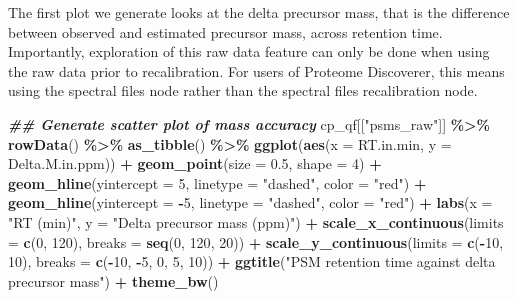 \documentclass[9pt,a4paper,]{extarticle}
\newenvironment{Shaded}{\begin{snugshade}}{\end{snugshade}}
\newcommand{\AttributeTok}[1]{\textcolor[rgb]{0.13,0.29,0.53}{#1}}
\newcommand{\DecValTok}[1]{\textcolor[rgb]{0.00,0.00,0.81}{#1}}
\newcommand{\DocumentationTok}[1]{\textcolor[rgb]{0.56,0.35,0.01}{\textbf{\textit{#1}}}}
\newcommand{\FloatTok}[1]{\textcolor[rgb]{0.00,0.00,0.81}{#1}}
\newcommand{\FunctionTok}[1]{\textcolor[rgb]{0.13,0.29,0.53}{\textbf{#1}}}
\newcommand{\NormalTok}[1]{#1}
\newcommand{\SpecialCharTok}[1]{\textcolor[rgb]{0.81,0.36,0.00}{\textbf{#1}}}
\newcommand{\StringTok}[1]{\textcolor[rgb]{0.31,0.60,0.02}{#1}}
\begin{document}
The first plot we generate looks at the delta precursor mass, that is the
difference between observed and estimated precursor mass, across retention time.
Importantly, exploration of this raw data feature can only be done when using
the raw data prior to recalibration. For users of Proteome Discoverer, this
means using the spectral files node rather than the spectral files recalibration
node.

\begin{Shaded}
\begin{Highlighting}[]
\DocumentationTok{\#\# Generate scatter plot of mass accuracy}
\NormalTok{cp\_qf[[}\StringTok{"psms\_raw"}\NormalTok{]] }\SpecialCharTok{\%\textgreater{}\%}
  \FunctionTok{rowData}\NormalTok{() }\SpecialCharTok{\%\textgreater{}\%} 
  \FunctionTok{as\_tibble}\NormalTok{() }\SpecialCharTok{\%\textgreater{}\%}
  \FunctionTok{ggplot}\NormalTok{(}\FunctionTok{aes}\NormalTok{(}\AttributeTok{x =}\NormalTok{ RT.in.min, }\AttributeTok{y =}\NormalTok{ Delta.M.in.ppm)) }\SpecialCharTok{+}
  \FunctionTok{geom\_point}\NormalTok{(}\AttributeTok{size =} \FloatTok{0.5}\NormalTok{, }\AttributeTok{shape =} \DecValTok{4}\NormalTok{) }\SpecialCharTok{+}
  \FunctionTok{geom\_hline}\NormalTok{(}\AttributeTok{yintercept =} \DecValTok{5}\NormalTok{, }\AttributeTok{linetype =} \StringTok{"dashed"}\NormalTok{, }\AttributeTok{color =} \StringTok{"red"}\NormalTok{) }\SpecialCharTok{+}
  \FunctionTok{geom\_hline}\NormalTok{(}\AttributeTok{yintercept =} \SpecialCharTok{{-}}\DecValTok{5}\NormalTok{, }\AttributeTok{linetype =} \StringTok{"dashed"}\NormalTok{, }\AttributeTok{color =} \StringTok{"red"}\NormalTok{) }\SpecialCharTok{+}
  \FunctionTok{labs}\NormalTok{(}\AttributeTok{x =} \StringTok{"RT (min)"}\NormalTok{, }\AttributeTok{y =} \StringTok{"Delta precursor mass (ppm)"}\NormalTok{) }\SpecialCharTok{+}
  \FunctionTok{scale\_x\_continuous}\NormalTok{(}\AttributeTok{limits =} \FunctionTok{c}\NormalTok{(}\DecValTok{0}\NormalTok{, }\DecValTok{120}\NormalTok{), }\AttributeTok{breaks =} \FunctionTok{seq}\NormalTok{(}\DecValTok{0}\NormalTok{, }\DecValTok{120}\NormalTok{, }\DecValTok{20}\NormalTok{)) }\SpecialCharTok{+}
  \FunctionTok{scale\_y\_continuous}\NormalTok{(}\AttributeTok{limits =} \FunctionTok{c}\NormalTok{(}\SpecialCharTok{{-}}\DecValTok{10}\NormalTok{, }\DecValTok{10}\NormalTok{), }\AttributeTok{breaks =} \FunctionTok{c}\NormalTok{(}\SpecialCharTok{{-}}\DecValTok{10}\NormalTok{, }\SpecialCharTok{{-}}\DecValTok{5}\NormalTok{, }\DecValTok{0}\NormalTok{, }\DecValTok{5}\NormalTok{, }\DecValTok{10}\NormalTok{)) }\SpecialCharTok{+}
  \FunctionTok{ggtitle}\NormalTok{(}\StringTok{"PSM retention time against delta precursor mass"}\NormalTok{) }\SpecialCharTok{+}
  \FunctionTok{theme\_bw}\NormalTok{()}
\end{Highlighting}
\end{Shaded}
\end{document}
